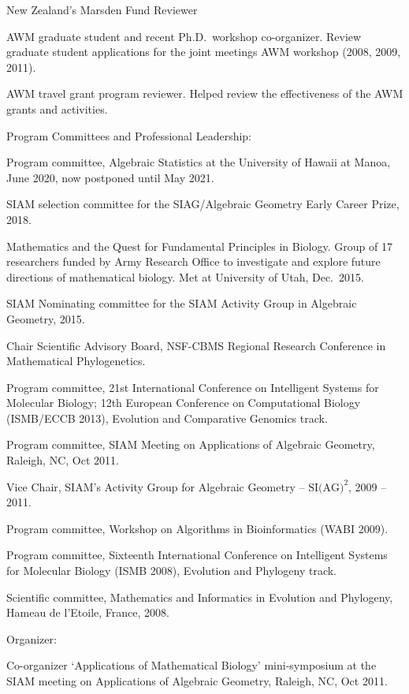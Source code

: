 \documentclass[10pt]{report}
\begin{document}
{New Zealand's Marsden Fund Reviewer

AWM graduate student and recent Ph.D.~workshop co-organizer.  Review
graduate student applications for the joint meetings AWM workshop
(2008, 2009, 2011).

AWM travel grant program reviewer.  Helped review the
effectiveness of the AWM grants and activities.

\bigskip

{\sc Program Committees and Professional Leadership:}

\smallskip

Program committee, Algebraic Statistics at the University of Hawaii at Manoa, June 2020, now postponed
until May 2021.

SIAM selection committee for the SIAG/Algebraic Geometry Early Career Prize, 2018.

Mathematics and the Quest for Fundamental Principles in Biology.  Group of 17
researchers funded by Army Research Office to investigate and explore 
future directions of mathematical biology.  Met at University of Utah, Dec.~2015.

SIAM Nominating committee for the SIAM Activity Group in Algebraic Geometry, 2015.

Chair Scientific Advisory Board,
NSF-CBMS Regional Research Conference in Mathematical Phylogenetics.

Program committee, 21st International Conference on
Intelligent Systems for Molecular Biology; 12th European
Conference on Computational Biology (ISMB/ECCB 2013), Evolution and
Comparative Genomics track.

Program committee, SIAM Meeting on Applications of Algebraic Geometry, Raleigh, NC, Oct 2011.

Vice Chair, SIAM's Activity Group for Algebraic Geometry -- $\text{SI(AG)}^2$, 2009 -- 2011.

Program committee, Workshop on Algorithms in Bioinformatics (WABI 2009).

Program committee, Sixteenth International Conference on
Intelligent Systems for Molecular Biology (ISMB 2008), Evolution and
Phylogeny track.

Scientific committee, Mathematics and Informatics in Evolution
and Phylogeny, Hameau de l'Etoile, France, 2008.

\bigskip

{\sc Organizer:}

\smallskip

Co-organizer `Applications of Mathematical Biology' mini-symposium at
the SIAM meeting on Applications of Algebraic Geometry, Raleigh, NC, Oct 2011.

}
\end{document}
